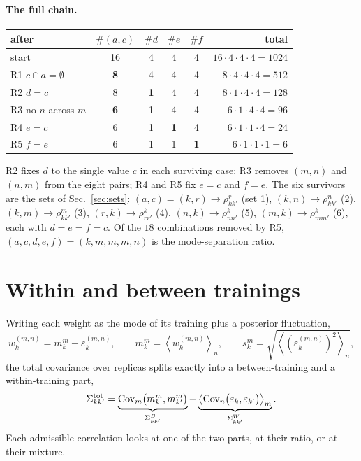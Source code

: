 \documentclass[11pt]{article}
\newcommand{\avg}[2]{\left\langle #1 \right\rangle_{#2}}
\begin{document}
\paragraph{The full chain.}
\begin{center}
\begin{tabular}{lccccr}
\toprule
after & $\#(a,c)$ & $\#d$ & $\#e$ & $\#f$ & total\\
\midrule
start & 16 & 4 & 4 & 4 & $16\cdot 4\cdot 4\cdot 4 = 1024$\\
R1 $c\cap a=\emptyset$ & \textbf{8} & 4 & 4 & 4 & $8\cdot 4\cdot 4\cdot 4 = 512$\\
R2 $d=c$ & 8 & \textbf{1} & 4 & 4 & $8\cdot 1\cdot 4\cdot 4 = 128$\\
R3 no $n$ across $m$ & \textbf{6} & 1 & 4 & 4 & $6\cdot 1\cdot 4\cdot 4 = 96$\\
R4 $e=c$ & 6 & 1 & \textbf{1} & 4 & $6\cdot 1\cdot 1\cdot 4 = 24$\\
R5 $f=e$ & 6 & 1 & 1 & \textbf{1} & $6\cdot 1\cdot 1\cdot 1 = 6$\\
\bottomrule
\end{tabular}
\end{center}
R2 fixes $d$ to the single value $c$ in each surviving case; R3 removes $(m,n)$ and $(n,m)$ from the
eight pairs; R4 and R5 fix $e=c$ and $f=e$. The six survivors are the sets of Sec.~\ref{sec:sets}:
$(a,c) = (k,r)\to\rho^{r}_{kk'}$ (set 1), $(k,n)\to\rho^{n}_{kk'}$ (2), $(k,m)\to\rho^{m}_{kk'}$ (3),
$(r,k)\to\rho^{k}_{rr'}$ (4), $(n,k)\to\rho^{k}_{nn'}$ (5), $(m,k)\to\rho^{k}_{mm'}$ (6), each with $d=e=f=c$. Of the $18$ combinations removed by R5, $(a,c,d,e,f) = (k,m,m,m,n)$ is the mode-separation
ratio.

\section{Within and between trainings}
Writing each weight as the mode of its training plus a posterior fluctuation,
\begin{equation}
  w_k^{(m,n)} = m_k^{m} + \varepsilon_k^{(m,n)},\qquad m_k^{m} = \avg{w_k^{(m,n)}}{n},\qquad
  s_k^{m} = \sqrt{\avg{(\varepsilon_k^{(m,n)})^2}{n}},
\end{equation}
the total covariance over replicas splits exactly into a between-training and a within-training part,
\begin{equation}
  \Sigma^{\rm tot}_{kk'} = \underbrace{\mathrm{Cov}_m\bigl(m_k^{m}, m_{k'}^{m}\bigr)}_{\Sigma^{B}_{kk'}}
  + \underbrace{\avg{\mathrm{Cov}_n\bigl(\varepsilon_k, \varepsilon_{k'}\bigr)}{m}}_{\Sigma^{W}_{kk'}} .
\end{equation}
Each admissible correlation looks at one of the two parts, at their ratio, or at their mixture.
\end{document}
